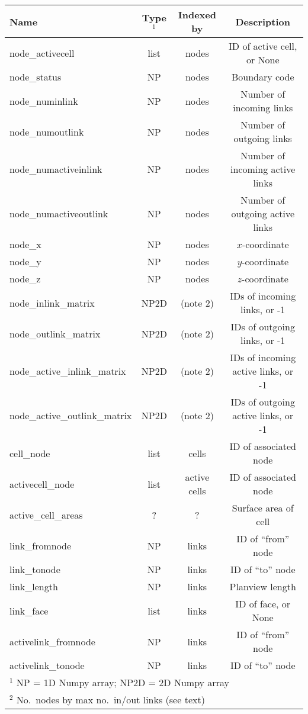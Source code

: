 \documentclass[12pt]{amsart}
\begin{document}
\begin{table}[htbp]
\begin{tabular}{@{} lccc @{}}
      Name & Type$^1$ & Indexed by & Description \\
      \midrule
      node\_activecell & list  & nodes & ID of active cell, or None \\
      node\_status 	& NP & nodes & Boundary code \\
      node\_numinlink  & NP & nodes & Number of incoming links  \\
      node\_numoutlink  & NP & nodes & Number of outgoing links  \\
      node\_numactiveinlink  & NP & nodes & Number of incoming active links  \\
      node\_numactiveoutlink  & NP & nodes & Number of outgoing active links  \\
      node\_x & NP & nodes & $x$-coordinate \\
      node\_y & NP & nodes & $y$-coordinate \\
      node\_z & NP & nodes & $z$-coordinate \\
      node\_inlink\_matrix & NP2D & (note 2) & IDs of incoming links, or -1 \\
      node\_outlink\_matrix & NP2D &  (note 2) & IDs of outgoing links, or -1 \\
      node\_active\_inlink\_matrix & NP2D &  (note 2) & IDs of incoming active links, or -1 \\
      node\_active\_outlink\_matrix & NP2D &  (note 2) & IDs of outgoing active links, or -1 \\
      cell\_node & list & cells & ID of associated node \\
      activecell\_node & list & active cells & ID of associated node \\
      active\_cell\_areas & ? & ? & Surface area of cell \\
      link\_fromnode & NP & links & ID of ``from'' node \\
      link\_tonode & NP & links & ID of ``to'' node \\
      link\_length & NP & links & Planview length \\
      link\_face & list & links & ID of face, or None \\
      activelink\_fromnode & NP & links & ID of ``from'' node \\
      activelink\_tonode & NP & links & ID of ``to'' node \\
      \bottomrule
      \multicolumn{4}{l}{$^1$ NP = 1D Numpy array; NP2D = 2D Numpy array} \\
      \multicolumn{4}{l}{$^2$ No.\ nodes by max no.\ in/out links (see text)} \\
   \end{tabular}
   \label{tab:formulas}
\end{table}
\end{document}
